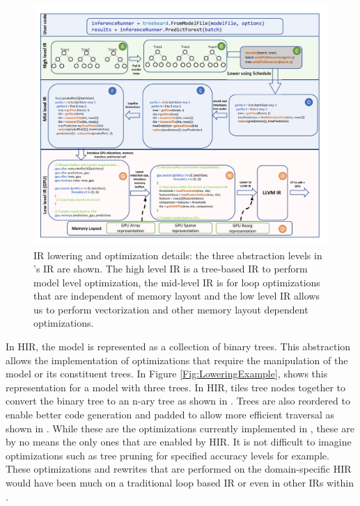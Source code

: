 \begin{figure}[htb]
  \centering
  \includegraphics[width=\linewidth]{figures/GPUCompilationOverview-cropped.pdf}
  \vskip 10pt
  \caption{\Treebeard{} IR lowering and optimization details: the three abstraction levels in \Treebeard{}'s IR are shown. The
           high level IR is a tree-based IR to perform model level optimization, the mid-level IR is for
           loop optimizations that are independent of memory layout and the low level IR allows us to perform
           vectorization and other memory layout dependent optimizations.}
  \label{Fig:GPULoweringExample}
\end{figure}

In HIR, the model is represented as a collection of binary trees. This abstraction
allows the implementation of optimizations that require the manipulation of the model
or its constituent trees. In Figure \ref{Fig:LoweringExample}, 
shows this representation for a model with three trees. 
In HIR, \Treebeard{} tiles tree nodes together to convert
the binary tree to an n-ary tree as shown in . Trees are also 
reordered to enable better code generation and padded to allow more 
efficient traversal as shown in . While these are the optimizations currently 
implemented in \Treebeard{}, these are by no means the only ones that 
are enabled by HIR. It is not difficult to imagine optimizations 
such as tree pruning for specified accuracy levels for example.
These optimizations and rewrites that are performed on the domain-specific 
HIR would have been much on a traditional loop based IR or even in 
other IRs within \Treebeard{}.


